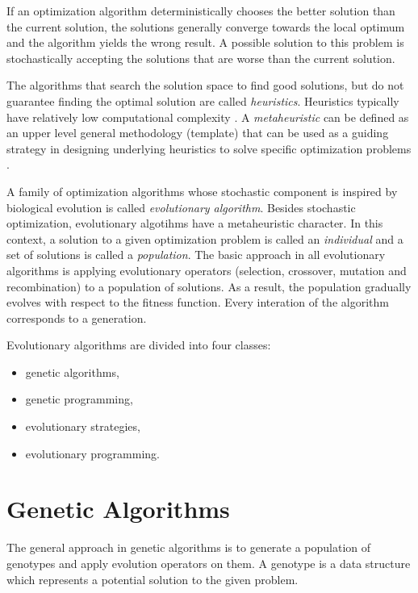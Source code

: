If an optimization algorithm deterministically chooses the better solution than the current solution, the solutions generally converge towards the local optimum and the algorithm yields the wrong result.
A possible solution to this problem is stochastically accepting the solutions that are worse than the current solution.

The algorithms that search the solution space to find good solutions, but do not guarantee finding the optimal solution are called \textit{heuristics}. 
Heuristics typically have relatively low computational complexity \cite{cupic2013prirodom}.
A \textit{metaheuristic} can be defined as an upper level general methodology (template) that can be used as a guiding strategy in designing underlying heuristics to solve specific optimization problems \cite{talbi2009metaheuristics}.

A family of optimization algorithms whose stochastic component is inspired by biological evolution is called \textit{evolutionary algorithm}.
Besides stochastic optimization, evolutionary algotihms have a metaheuristic character.
In this context, a solution to a given optimization problem is called an \textit{individual} and a set of solutions is called a \textit{population}.
The basic approach in all evolutionary algorithms is applying evolutionary operators (selection, crossover, mutation and recombination) to a population of solutions.
As a result, the population gradually evolves with respect to the fitness function.
Every interation of the algorithm corresponds to a generation.

Evolutionary algorithms are divided into four classes: 
\begin{itemize}
	\item genetic algorithms,
	\item genetic programming,
	\item evolutionary strategies,
	\item evolutionary programming.
\end{itemize}

\section{Genetic Algorithms}
The general approach in genetic algorithms is to generate a population of genotypes and apply evolution operators on them.
A genotype is a data structure which represents a potential solution to the given problem.

